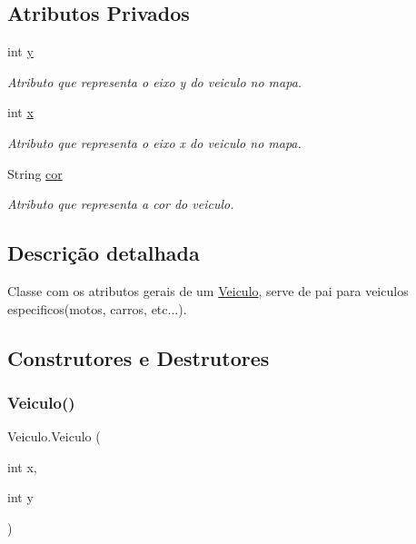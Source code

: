 \subsection*{Atributos Privados}
\begin{DoxyCompactItemize}
\item 
int \mbox{\hyperlink{class_veiculo_af25046404db7c2786c0d9e468bb1fb64}{y}}
\begin{DoxyCompactList}\small\item\em Atributo que representa o eixo y do veiculo no mapa. \end{DoxyCompactList}\item 
int \mbox{\hyperlink{class_veiculo_a069917a284297fe5b385258b2afd9ad6}{x}}
\begin{DoxyCompactList}\small\item\em Atributo que representa o eixo x do veiculo no mapa. \end{DoxyCompactList}\item 
String \mbox{\hyperlink{class_veiculo_a6bc5886e61340672e69bd638936ec1d5}{cor}}
\begin{DoxyCompactList}\small\item\em Atributo que representa a cor do veiculo. \end{DoxyCompactList}\end{DoxyCompactItemize}


\subsection{Descrição detalhada}
Classe com os atributos gerais de um \mbox{\hyperlink{class_veiculo}{Veiculo}}, serve de pai para veiculos especificos(motos, carros, etc...). 

\subsection{Construtores e Destrutores}
\mbox{\label{class_veiculo_a47f634662187ef78027f99a3ab6708a5}} 
\subsubsection{\texorpdfstring{Veiculo()}{Veiculo()}}
{\footnotesize\ttfamily Veiculo.\+Veiculo (\begin{DoxyParamCaption}\item[{int}]{x,  }\item[{int}]{y }\end{DoxyParamCaption})}

